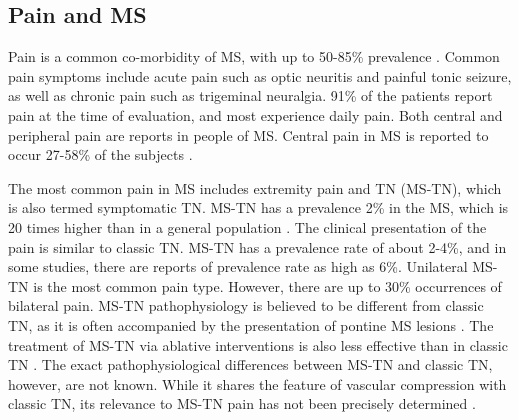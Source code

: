 \subsection{Pain and MS}
Pain is a common co-morbidity of MS, with up to 50-85\% prevalence \cite{Osterberg2005}. Common pain symptoms include acute pain such as optic neuritis and painful tonic seizure, as well as chronic pain such as trigeminal neuralgia. 91\% of the patients report pain at the time of evaluation, and most experience daily pain. Both central and peripheral pain are reports in people of MS. Central pain in MS is reported to occur 27-58\% of the subjects \cite{OConnor2008}. 

The most common pain in MS includes extremity pain and TN (MS-TN), which is also termed symptomatic TN. MS-TN has a prevalence 2\% in the MS, which is 20 times higher than in a general population \cite{Cruccu2009}. The clinical presentation of the pain is similar to classic TN. MS-TN has a prevalence rate of about 2-4\%, and in some studies, there are reports of prevalence rate as high as 6\%. Unilateral MS-TN is the most common pain type. However, there are up to 30\% occurrences of bilateral pain. MS-TN pathophysiology is believed to be different from classic TN, as it is often accompanied by the presentation of pontine MS lesions \cite{Cruccu2009}. The treatment of MS-TN via ablative interventions is also less effective than in classic TN \cite{Nurmikko2009}. The exact pathophysiological differences between MS-TN and classic TN, however, are not known. While it shares the feature of vascular compression with classic TN, its relevance to MS-TN pain has not been precisely determined \cite{Nurmikko2009}.